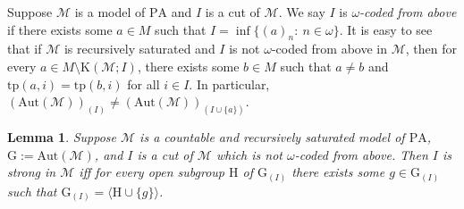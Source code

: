 \documentclass[11pt]{article}
\theoremstyle{plain}
\newtheorem{lem}[theorem]{Lemma}
\theoremstyle{definition}
\newcommand{\M}{\mathcal{M}}
\newcommand{\G}{\mathrm{G}}
\newcommand{\A}{\mathrm{Aut}}
\newcommand{\pa}{\mathrm{PA}}
\newcommand{\tp}{\mathrm{tp}}
\begin{document}
Suppose $\M$ is a  model of $\pa$ and $I$ is a cut of $\M$. We say  $I$  is \textit{$\omega$-coded from above} if there  exists some $a\in M$ such that ${I=\inf\{(a)_{n}: \ n\in\omega\}}$. 
	It is easy to see that if $\M$ is recursively saturated and $I$ is not $\omega$-coded from above in $\M$, then for every $a\in M\setminus\mathrm{K}(\M;I)$, there exists some $b\in M $ such that $a\neq b$ and $\tp(a,i)=\tp(b,i)$ for all $i\in I$. In particular, $(\A(\M))_{(I)}\neq(\A(\M))_{(I\cup\{a\})} $. 

\begin{lem}
Suppose $\M$ is a countable and recursively saturated model of $\pa$, ${\G:=\A(\M)}$, and $I$ is a cut of $\M$ which is not $\omega$-coded from above. Then $I$ is strong in $\M$ iff for every open subgroup  $\mathrm{H}$ of $\G_{(I)}$ there exists some $g\in \G_{(I)}$ such that $\G_{(I)}=\langle \mathrm{H}\cup\{g\}\rangle$.
\end{lem}
\end{document}
